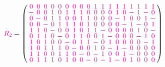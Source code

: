 \documentclass{beamer}
\newcommand{\mmag}[1]{\textcolor{magenta}{#1}}
\begin{document}
\begin{frame}

  \[
    \mmag{R_2} =
    \left(
      \arraycolsep=1.25pt\def\arraystretch{0.625}
      \begin{array}{cccccccccccccccccc}
        \mmag{0}&\mmag{0}&\mmag{0}&\mmag{0}&\mmag{0}&\mmag{0}&\mmag{0}&\mmag{0}&\mmag{0}&\mmag{1}&\mmag{1}&\mmag{1}&\mmag{1}&\mmag{1}&\mmag{1}&\mmag{1}&\mmag{1}&\mmag{1}\\
        \mmag{-}&\mmag{0}&\mmag{0}&\mmag{1}&\mmag{0}&\mmag{1}&\mmag{1}&\mmag{1}&\mmag{0}&\mmag{0}&\mmag{0}&\mmag{0}&\mmag{1}&\mmag{0}&\mmag{-}&\mmag{1}&\mmag{-}&\mmag{0}\\
        \mmag{0}&\mmag{-}&\mmag{0}&\mmag{1}&\mmag{1}&\mmag{0}&\mmag{0}&\mmag{1}&\mmag{1}&\mmag{0}&\mmag{0}&\mmag{0}&\mmag{-}&\mmag{1}&\mmag{0}&\mmag{0}&\mmag{1}&\mmag{-}\\
        \mmag{0}&\mmag{0}&\mmag{-}&\mmag{0}&\mmag{1}&\mmag{1}&\mmag{1}&\mmag{0}&\mmag{1}&\mmag{0}&\mmag{0}&\mmag{0}&\mmag{0}&\mmag{-}&\mmag{1}&\mmag{-}&\mmag{0}&\mmag{1}\\
        \mmag{1}&\mmag{1}&\mmag{0}&\mmag{-}&\mmag{0}&\mmag{0}&\mmag{1}&\mmag{0}&\mmag{1}&\mmag{1}&\mmag{-}&\mmag{0}&\mmag{0}&\mmag{0}&\mmag{0}&\mmag{1}&\mmag{0}&\mmag{-}\\
        \mmag{0}&\mmag{1}&\mmag{1}&\mmag{0}&\mmag{-}&\mmag{0}&\mmag{1}&\mmag{1}&\mmag{0}&\mmag{0}&\mmag{1}&\mmag{-}&\mmag{0}&\mmag{0}&\mmag{0}&\mmag{-}&\mmag{1}&\mmag{0}\\
        \mmag{1}&\mmag{0}&\mmag{1}&\mmag{0}&\mmag{0}&\mmag{-}&\mmag{0}&\mmag{1}&\mmag{1}&\mmag{-}&\mmag{0}&\mmag{1}&\mmag{0}&\mmag{0}&\mmag{0}&\mmag{0}&\mmag{-}&\mmag{1}\\
        \mmag{1}&\mmag{0}&\mmag{1}&\mmag{1}&\mmag{1}&\mmag{0}&\mmag{-}&\mmag{0}&\mmag{0}&\mmag{1}&\mmag{0}&\mmag{-}&\mmag{1}&\mmag{-}&\mmag{0}&\mmag{0}&\mmag{0}&\mmag{0}\\
        \mmag{1}&\mmag{1}&\mmag{0}&\mmag{0}&\mmag{1}&\mmag{1}&\mmag{0}&\mmag{-}&\mmag{0}&\mmag{-}&\mmag{1}&\mmag{0}&\mmag{0}&\mmag{1}&\mmag{-}&\mmag{0}&\mmag{0}&\mmag{0}\\
        \mmag{0}&\mmag{1}&\mmag{1}&\mmag{1}&\mmag{0}&\mmag{1}&\mmag{0}&\mmag{0}&\mmag{-}&\mmag{0}&\mmag{-}&\mmag{1}&\mmag{-}&\mmag{0}&\mmag{1}&\mmag{0}&\mmag{0}&\mmag{0}\\
      \end{array}
    \right)
  \]

  
\end{frame}
\end{document}
